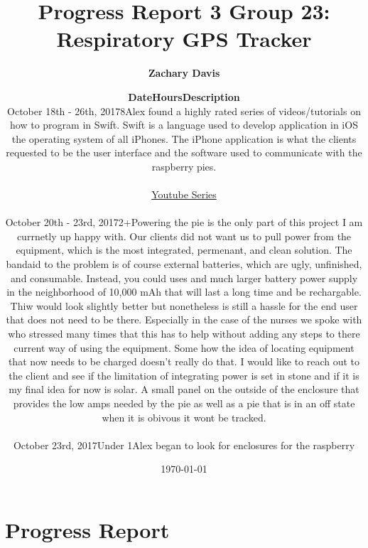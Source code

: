\documentclass[11pt]{report}
\title{
  Progress Report 3
\bigbreak Group 23: Respiratory GPS Tracker
}
\author{\textbf{Zachary Davis}}
\date{\bigskip
\today}
\begin{document}
\maketitle

\section*{Progress Report}
	\begin{center}
		\author{
		{\normalsize
		\begin{tabular}{m{4cm} m{2cm} m{10cm}}
		\textbf{Date} & \textbf{Hours} & \textbf{Description}\\
		\hline
		October 18th - 26th, 2017 & 8 & Alex found a highly rated series of videos/tutorials on how to 
		program in Swift.  Swift is a language used to develop application in iOS the operating 
		system of all iPhones.  The iPhone application is what the clients requested to be the 
		user interface and the software used to communicate with the raspberry pies.  \\\\&&\href{https://www.youtube.com/watch?v=83WXmhin_LU}{Youtube Series}\\
		 & & \\
		October 20th - 23rd, 2017 & 2+ & Powering the pie is the only part of this project I am 
		currnetly up happy with.  Our clients did not want us to pull power from the equipment, 
		which is the most integrated, permenant, and clean solution.  The bandaid to the problem 
		is of course external batteries, which are ugly, unfinished, and consumable.  Instead, you 
		could uses and much larger battery power supply in the neighborhood of 10,000 mAh that 
		will last a long time and be rechargable. Thiw would look slightly better but nonetheless 
		is still a hassle for the end user that does not need to be there.  Especially in the case 
		of the nurses we spoke with who stressed many times that this has to help without adding 
		any steps to there current way of using the equipment.  Some how the idea of locating 
		equipment that now needs to be charged doesn't really do that.  I would like to reach out 
		to the client and see if the limitation of integrating power is set in stone and if it is 
		my final idea for now is solar.  A small panel on the outside of the enclosure that 
		provides the low amps needed by the pie as well as a pie that is in an off state when it 
		is obivous it wont be tracked.\\
		 & & \\
		October 23rd, 2017 & Under 1 & Alex began to look for enclosures for the raspberry 

\end{tabular}}}
\end{center}
\end{document}
